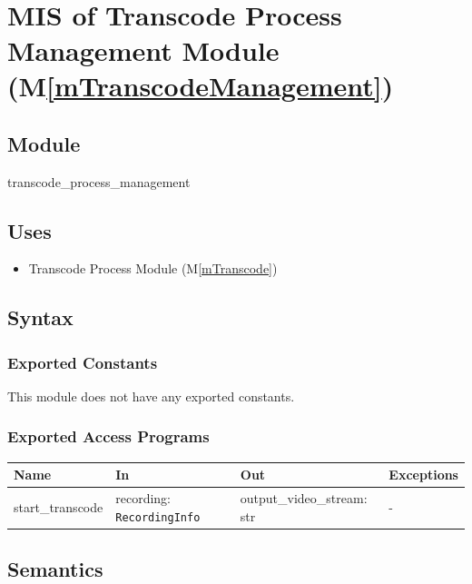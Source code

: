 \documentclass[12pt, titlepage]{article}
\newcommand{\mref}[1]{M\ref{#1}}
\begin{document}
\ \

\section{MIS of Transcode Process Management Module (\mref{mTranscodeManagement})}

\subsection{Module}

transcode\_process\_management

\subsection{Uses}

\begin{itemize}
  \item Transcode Process Module (\mref{mTranscode})
\end{itemize}

\subsection{Syntax}

\subsubsection{Exported Constants}

This module does not have any exported constants.

\subsubsection{Exported Access Programs}

\begin{center}
  \begin{tabular}{p{3cm} p{4cm} p{4cm} p{3.5cm}}
    \hline
    \textbf{Name}    & \textbf{In}                       & \textbf{Out}               & \textbf{Exceptions} \\
    \hline
    start\_transcode & recording: \texttt{RecordingInfo} & output\_video\_stream: str & -                   \\
    \hline
  \end{tabular}
\end{center}

\subsection{Semantics}
\end{document}
